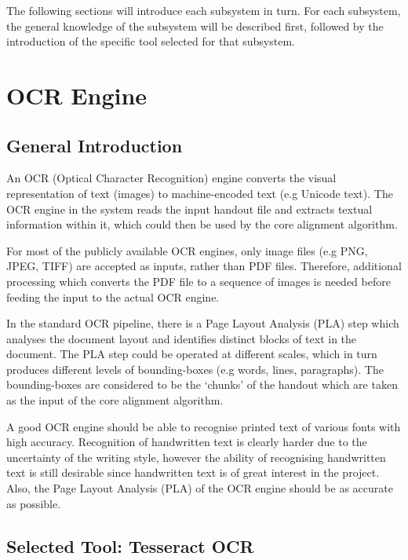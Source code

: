 The following sections will introduce each subsystem in turn. For each subsystem, the general knowledge of the subsystem will be described first, followed by the introduction of the specific tool selected for that subsystem.

\section{OCR Engine}

\subsection{General Introduction}

An OCR (Optical Character Recognition) engine converts the visual representation of text (images) to machine-encoded text (e.g Unicode text). The OCR engine in the system reads the input handout file and extracts textual information within it, which could then be used by the core alignment algorithm.

For most of the publicly available OCR engines, only image files (e.g PNG, JPEG, TIFF) are accepted as inputs, rather than PDF files. Therefore, additional processing which converts the PDF file to a sequence of images is needed before feeding the input to the actual OCR engine. 

In the standard OCR pipeline, there is a Page Layout Analysis (PLA) step which analyses the document layout and identifies distinct blocks of text in the document. The PLA step could be operated at different scales, which in turn produces different levels of bounding-boxes (e.g words, lines, paragraphs). The bounding-boxes are considered to be the `chunks' of the handout which are taken as the input of the core alignment algorithm.

A good OCR engine should be able to recognise printed text of various fonts with high accuracy. Recognition of handwritten text is clearly harder due to the uncertainty of the writing style, however the ability of recognising handwritten text is still desirable since handwritten text is of great interest in the project. Also, the Page Layout Analysis (PLA) of the OCR engine should be as accurate as possible.

\subsection{Selected Tool: Tesseract OCR}

